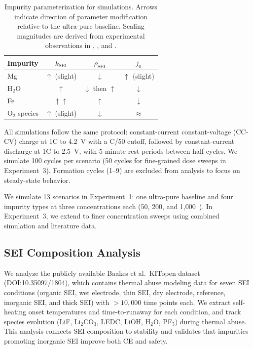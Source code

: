 \begin{table}[t]
    \centering
    \caption{Impurity parameterization for \pybamm simulations. Arrows indicate direction of parameter modification relative to the ultra-pure baseline. Scaling magnitudes are derived from experimental observations in \citet{choe2024reevaluation}, \citet{fink2021metallic}, and \citet{baakes2023impact}.}
    \begin{tabular}{@{}lccc@{}}
        \toprule
        Impurity & $k_\text{SEI}$ & $\rho_\text{SEI}$ & $j_0$ \\
        \midrule
        Mg      & $\uparrow$ (slight) & $\downarrow$ & $\uparrow$ (slight) \\
        H$_2$O  & $\uparrow$ & $\downarrow$ then $\uparrow$ & $\downarrow$ \\
        Fe      & $\uparrow\uparrow$ & $\uparrow$ & $\downarrow$ \\
        O$_2$ species & $\uparrow$ (slight) & $\downarrow$ & $\approx$ \\
        \bottomrule
    \end{tabular}
    \label{tab:parameterization}
\end{table}

All simulations follow the same protocol: constant-current constant-voltage (CC-CV) charge at 1C to 4.2~V with a C/50 cutoff, followed by constant-current discharge at 1C to 2.5~V, with 5-minute rest periods between half-cycles. We simulate 100 cycles per scenario (50 cycles for fine-grained dose sweeps in Experiment~3). Formation cycles (1--9) are excluded from analysis to focus on steady-state behavior.

We simulate 13 scenarios in Experiment~1: one ultra-pure baseline and four impurity types at three concentrations each (50, 200, and 1{,}000~\ppm). In Experiment~3, we extend to finer concentration sweeps using combined simulation and literature data.

\subsection{SEI Composition Analysis}
\label{sec:sei_analysis}

We analyze the publicly available Baakes et al.\ KITopen dataset (DOI:10.35097/1804), which contains thermal abuse modeling data for seven SEI conditions (organic SEI, wet electrode, thin SEI, dry electrode, reference, inorganic SEI, and thick SEI) with $>10{,}000$ time points each. We extract self-heating onset temperatures and time-to-runaway for each condition, and track species evolution (LiF, Li$_2$CO$_3$, LEDC, LiOH, H$_2$O, PF$_5$) during thermal abuse. This analysis connects SEI composition to stability and validates that impurities promoting inorganic SEI improve both CE and safety.

